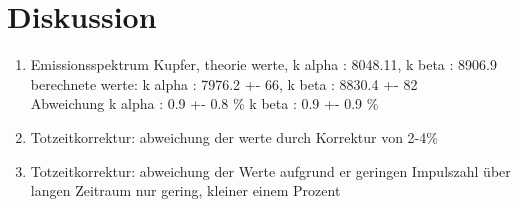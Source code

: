 \section{Diskussion}
    \begin{enumerate}
        \item Emissionsspektrum Kupfer, theorie werte,      k alpha : 8048.11,      k beta : 8906.9\\
                                        berechnete werte:   k alpha : 7976.2 +- 66, k beta : 8830.4 +- 82\\
                                        Abweichung          k alpha : 0.9 +- 0.8 \% k beta : 0.9 +- 0.9 \%
        \item Totzeitkorrektur: abweichung der werte durch Korrektur von 2-4\% 

        \item Totzeitkorrektur: abweichung der Werte aufgrund er geringen Impulszahl über langen Zeitraum nur gering, kleiner einem Prozent


    \end{enumerate}
